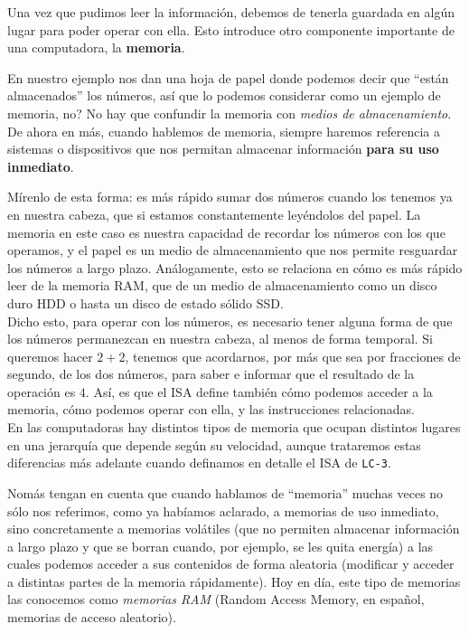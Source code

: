 \documentclass[a4paper, titlepage]{report}
\begin{document}
	Una vez que pudimos leer la información, debemos de tenerla guardada en algún lugar para poder operar con ella. Esto introduce otro componente importante de una computadora, la \textbf{memoria}.
	
	En nuestro ejemplo nos dan una hoja de papel donde podemos decir que ``están almacenados'' los números, así que lo podemos considerar como un ejemplo de memoria, no? No hay que confundir la memoria con \textit{medios de almacenamiento}. De ahora en más, cuando hablemos de memoria, siempre haremos referencia a sistemas o dispositivos que nos permitan almacenar información \textbf{para su uso inmediato}.
	
	Mírenlo de esta forma: es más rápido sumar dos números cuando los tenemos ya en nuestra cabeza, que si estamos constantemente leyéndolos del papel. La memoria en este caso es nuestra capacidad de recordar los números con los que operamos, y el papel es un medio de almacenamiento que nos permite resguardar los números a largo plazo. Análogamente, esto se relaciona en cómo es más rápido leer de la memoria RAM, que de un medio de almacenamiento como un disco duro HDD o hasta un disco de estado sólido SSD.\\
	
	Dicho esto, para operar con los números, es necesario tener alguna forma de que los números permanezcan en nuestra cabeza, al menos de forma temporal. Si queremos hacer $2+2$, tenemos que acordarnos, por más que sea por fracciones de segundo, de los dos números, para saber e informar que el resultado de la operación es $4$. Así, es que el ISA define también cómo podemos acceder a la memoria, cómo podemos operar con ella, y las instrucciones relacionadas.\\
	
	En las computadoras hay distintos tipos de memoria que ocupan distintos lugares en una jerarquía que depende según su velocidad, aunque trataremos estas diferencias más adelante cuando definamos en detalle el ISA de \texttt{LC-3}.
	
	Nomás tengan en cuenta que cuando hablamos de ``memoria'' muchas veces no sólo nos referimos, como ya habíamos aclarado, a memorias de uso inmediato, sino concretamente a memorias volátiles (que no permiten almacenar información a largo plazo y que se borran cuando, por ejemplo, se les quita energía) a las cuales podemos acceder a sus contenidos de forma aleatoria (modificar y acceder a distintas partes de la memoria rápidamente). Hoy en día, este tipo de memorias las conocemos como \textit{memorias RAM} (Random Access Memory, en español, memorias de acceso aleatorio).
	
\end{document}
